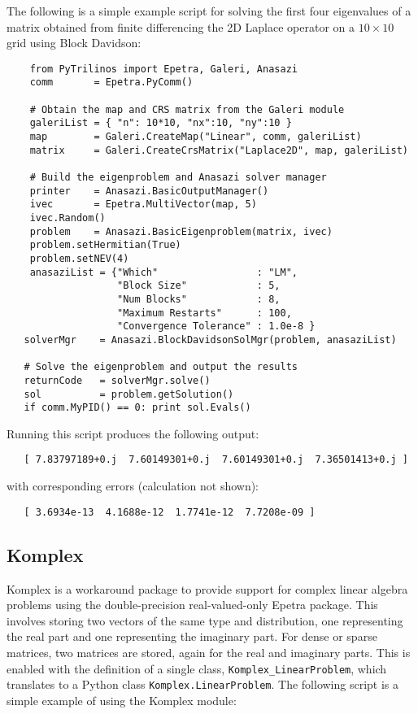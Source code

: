 \documentclass[11pt]{article}
\begin{document}
The following is a simple example script for solving the first four eigenvalues of a matrix obtained from finite differencing the 2D Laplace operator on a $10\times10$ grid using Block Davidson:
\begin{verbatim}
    from PyTrilinos import Epetra, Galeri, Anasazi
    comm       = Epetra.PyComm()
    
    # Obtain the map and CRS matrix from the Galeri module
    galeriList = { "n": 10*10, "nx":10, "ny":10 }
    map        = Galeri.CreateMap("Linear", comm, galeriList)
    matrix     = Galeri.CreateCrsMatrix("Laplace2D", map, galeriList)
    
    # Build the eigenproblem and Anasazi solver manager
    printer    = Anasazi.BasicOutputManager()
    ivec       = Epetra.MultiVector(map, 5)
    ivec.Random()
    problem    = Anasazi.BasicEigenproblem(matrix, ivec)
    problem.setHermitian(True)
    problem.setNEV(4)
    anasaziList = {"Which"                 : "LM",
                   "Block Size"            : 5,
                   "Num Blocks"            : 8,
                   "Maximum Restarts"      : 100,
                   "Convergence Tolerance" : 1.0e-8 }
   solverMgr    = Anasazi.BlockDavidsonSolMgr(problem, anasaziList)
   
   # Solve the eigenproblem and output the results
   returnCode   = solverMgr.solve()
   sol          = problem.getSolution()
   if comm.MyPID() == 0: print sol.Evals()
\end{verbatim}
Running this script produces the following output:
\begin{verbatim}
   [ 7.83797189+0.j  7.60149301+0.j  7.60149301+0.j  7.36501413+0.j ]
\end{verbatim}
with corresponding errors (calculation not shown):
\begin{verbatim}
   [ 3.6934e-13  4.1688e-12  1.7741e-12  7.7208e-09 ]
\end{verbatim}

\subsection{Komplex}
\label{sec:komplex}

Komplex is a workaround package to provide support for complex linear algebra problems using the double-precision real-valued-only Epetra package.  This involves storing two vectors of the same type and distribution, one representing the real part and one representing the imaginary part.  For dense or sparse matrices, two matrices are stored, again for the real and imaginary parts.  This is enabled with the definition of a single class, {\tt Komplex\_LinearProblem}, which translates to a Python class {\tt Komplex.LinearProblem}.  The following script is a simple example of using the Komplex module:
\end{document}
